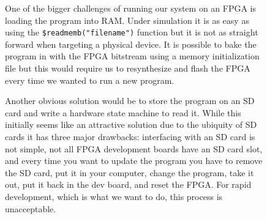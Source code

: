 \documentclass[10pt]{article}
\begin{document}
        \begin{figure}[H]
            \centering
            \begin{minipage}[t]{.6\textwidth}
                \vspace{0pt}
                One of the bigger challenges of running our system on an FPGA
                is loading the program into RAM.  Under simulation it is as easy
                as using the \texttt{\$readmemb("filename")} function but it is
                not as straight forward when targeting a physical device. It is
                possible to bake the program in with the FPGA bitstream using a
                memory initialization file \cite{mif} but this would require us
                to resynthesize and flash the FPGA every time we wanted to run
                a new program.

                \vspace{\baselineskip}
                Another obvious solution would be to store the program on an SD
                card and write a hardware state machine to read it. While this
                initially seems like an attractive solution due to the ubiquity
                of SD cards it has three major drawbacks: interfacing with an
                SD card is not simple, not all FPGA development boards have an
                SD card slot, and every time you want to update the program you
                have to remove the SD card, put it in your computer, change the
                program, take it out, put it back in the dev board, and reset
                the FPGA.  For rapid development, which is what we want to do,
                this process is unacceptable.


\end{minipage}
\end{figure}
\end{document}
